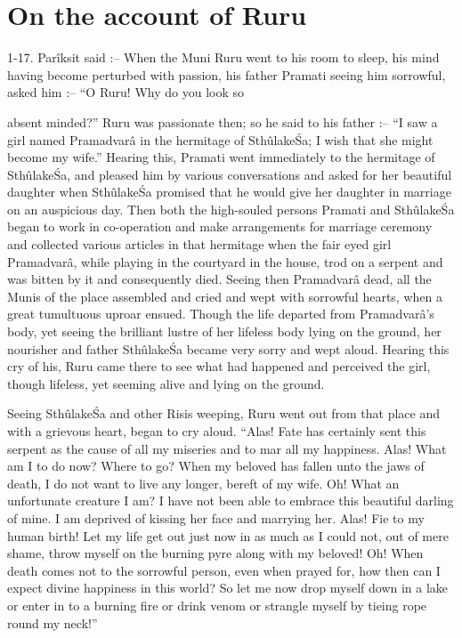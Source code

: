 ﻿\chapter{On the account of Ruru}

1-17. Par\^iksit said :-- When the Muni Ruru went to his room to sleep, his mind having become perturbed with passion, his father Pramati seeing him sorrowful, asked him :-- ``O Ruru! Why do you look so

absent minded?'' Ruru was passionate then; so he said to his father :-- ``I saw a girl named Pramadvar\^a in the hermitage of Sth\^ulake\'Sa; I wish that she might become my wife.'' Hearing this, Pramati went immediately to the hermitage of Sth\^ulake\'Sa, and pleased him by various conversations and asked for her beautiful daughter when Sth\^ulake\'Sa  promised that he would give her daughter in marriage on an auspicious day. Then both the high-souled persons Pramati and Sth\^ulake\'Sa began to work in co-operation and make arrangements for marriage ceremony and collected various articles in that hermitage when the fair eyed girl Pramadvar\^a, while playing in the courtyard in the house, trod on a serpent and was bitten by it and consequently died. Seeing then Pramadvar\^a dead, all the Munis of the place assembled and cried and wept with sorrowful hearts, when a great tumultuous uproar ensued. Though the life departed from Pramadvar\^a's body, yet seeing the brilliant lustre of her lifeless body lying on the ground, her nourisher and father Sth\^ulake\'Sa became very sorry and wept aloud. Hearing this cry of his, Ruru came there to see what had happened and perceived the girl, though lifeless, yet seeming alive and lying on the ground.

Seeing Sth\^ulake\'Sa and other Risis weeping, Ruru went out from that place and with a grievous heart, began to cry aloud. ``Alas! Fate has certainly sent this serpent as the cause of all my miseries and to mar all my happiness. Alas! What am I to do now? Where to go? When my beloved has fallen unto the jaws of death, I do not want to live any longer, bereft of my wife. Oh! What an unfortunate creature I am? I have not been able to embrace this beautiful darling of mine. I am deprived of kissing her face and marrying her. Alas! Fie to my human birth! Let my life get out just now in as much as I could not, out of mere shame, throw myself on the burning pyre along with my beloved! Oh! When death comes not to the sorrowful person, even when prayed for, how then can I expect divine happiness in this world? So let me now drop myself down in a lake or enter in to a burning fire or drink venom or strangle myself by tieing rope round my neck!''

